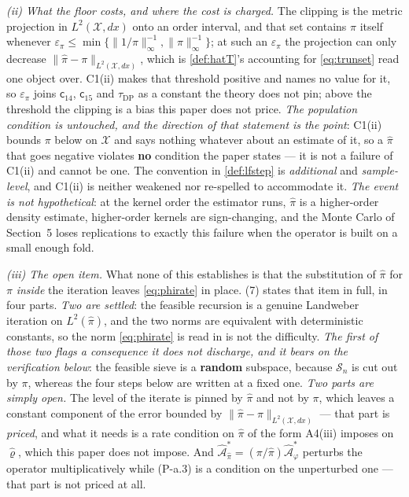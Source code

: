\emph{(ii) What the floor costs, and where the cost is charged.} The clipping is the metric projection
in $L^{2}(\mathcal X,dx)$ onto an order interval, and that set contains $\pi$ itself whenever
$\varepsilon_\pi\le\min\{\|1/\pi\|^{-1}_\infty,\|\pi\|^{-1}_\infty\}$; at such an $\varepsilon_\pi$ the
projection can only decrease $\|\hat\pi-\pi\|_{L^{2}(\mathcal X,dx)}$, which is
\cref{def:hatT}'s accounting for \eqref{eq:trunset} read one object over. C1(ii) makes that threshold
positive and names no value for it, so $\varepsilon_\pi$ joins $\mathsf c_{14}$, $\mathsf c_{15}$ and
$\tau_{\mathrm{DP}}$ as a constant the theory does not pin; above the threshold the clipping is a bias
this paper does not price. \emph{The population condition is untouched, and the direction of that
statement is the point}: C1(ii) bounds $\pi$ below on $\mathcal X$ and says nothing whatever about an
estimate of it, so a $\hat\pi$ that goes negative violates \textbf{no} condition the paper states --- it
is not a failure of C1(ii) and cannot be one. The convention in \cref{def:lfstep} is
\emph{additional} and \emph{sample-level}, and C1(ii) is neither weakened nor re-spelled to accommodate
it. \emph{The event is not hypothetical}: at the kernel order the estimator runs, $\hat\pi$ is a
higher-order density estimate, higher-order kernels are sign-changing, and the Monte Carlo of
Section~5 loses replications to exactly this failure when the operator is built on a small enough fold.

\emph{(iii) The open item.} What none of this establishes is that the substitution of $\hat\pi$ for
$\pi$ \emph{inside} the iteration leaves \eqref{eq:phirate} in place.
\textup{(7)} states that item in full, in four parts. \emph{Two are settled}:
the feasible recursion is a genuine Landweber iteration on $L^{2}(\hat\pi)$, and the two norms are
equivalent with deterministic constants, so the norm \eqref{eq:phirate} is read in is not the
difficulty. \emph{The first of those two flags a consequence it does not discharge, and it bears on the
verification below}: the feasible sieve is a \textbf{random} subspace, because $\mathcal S_n$ is cut out
by $\pi$, whereas the four steps below are written at a fixed one. \emph{Two parts are simply open.} The level of the iterate is pinned by $\hat\pi$ and not by $\pi$, which
leaves a constant component of the error bounded by $\|\hat\pi-\pi\|_{L^{2}(\mathcal X,dx)}$ --- that
part is \emph{priced}, and what it needs is a rate condition on $\hat\pi$ of the form A4(iii) imposes on
$\hat\varrho$, which this paper does not impose. And
$\hat{\mathcal A}^\ast_{\hat\pi}=(\pi/\hat\pi)\hat{\mathcal A}^\ast_\varphi$ perturbs the operator
multiplicatively while (P-a.3) is a condition on the unperturbed one --- that part is not priced at all.

